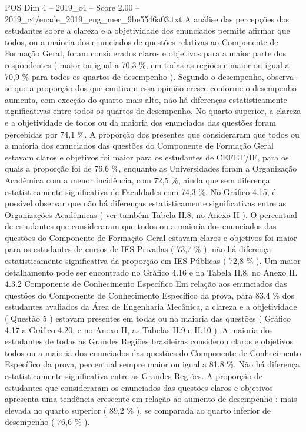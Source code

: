 \begin{textsample}{POS Dim 4 – 2019\_c4 – Score 2.00 – 2019\_c4/enade\_2019\_eng\_mec\_9be5546a03.txt}
A análise das percepções dos estudantes sobre a clareza e a objetividade dos enunciados permite afirmar que todos, ou a maioria dos enunciados de questões relativas ao Componente de Formação Geral, foram considerados claros e objetivos para a maior parte dos respondentes ( maior ou igual a 70,3 \%, em todas as regiões e maior ou igual a 70,9 \% para todos os quartos de desempenho ).
Segundo o desempenho, observa -se que a proporção dos que emitiram essa opinião cresce conforme o desempenho aumenta, com exceção do quarto mais alto, não há diferenças estatisticamente significativas entre todos os quartos de desempenho.
No quarto superior, a clareza e a objetividade de todos ou da maioria dos enunciados das questões foram percebidas por 74,1 \%.
A proporção dos presentes que consideraram que todos ou a maioria dos enunciados das questões do Componente de Formação Geral estavam claros e objetivos foi maior para os estudantes de CEFET/IF, para os quais a proporção foi de 76,6 \%, enquanto as Universidades foram a Organização Acadêmica com a menor incidência, com 72,5 \%, ainda que sem diferença estatisticamente significativa de Faculdades com 74,3 \%.
No Gráfico 4.15, é possível observar que não há diferenças estatisticamente significativas entre as Organizações Acadêmicas ( ver também Tabela II.8, no Anexo II ).
O percentual de estudantes que consideraram que todos ou a maioria dos enunciados das questões do Componente de Formação Geral estavam claros e objetivos foi maior para os estudantes de cursos de IES Privadas ( 73,7 \% ), não há diferença estatisticamente significativa da proporção em IES Públicas ( 72,8 \% ).
Um maior detalhamento pode ser encontrado no Gráfico 4.16 e na Tabela II.8, no Anexo II. 4.3.2 Componente de Conhecimento Específico Em relação aos enunciados das questões do Componente de Conhecimento Específico da prova, para 83,4 \% dos estudantes avaliados da Área de Engenharia Mecânica, a clareza e a objetividade ( Questão 5 ) estavam presentes em todas ou na maioria das questões ( Gráfico 4.17 a Gráfico 4.20, e no Anexo II, as Tabelas II.9 e II.10 ).
A maioria dos estudantes de todas as Grandes Regiões brasileiras considerou claros e objetivos todos ou a maioria dos enunciados das questões do Componente de Conhecimento Específico da prova, percentual sempre maior ou igual a 81,8 \%.
Não há diferença estatisticamente significativa entre as Grandes Regiões.
A proporção de estudantes que consideraram os enunciados das questões claros e objetivos apresenta uma tendência crescente em relação ao aumento de desempenho : mais elevada no quarto superior ( 89,2 \% ), se comparada ao quarto inferior de desempenho ( 76,6 \% ).

\end{textsample}
